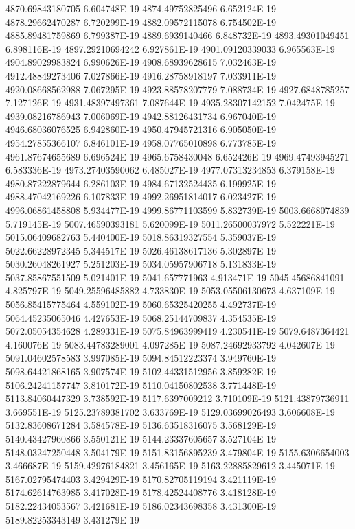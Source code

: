 4870.69843180705  6.604748E-19
4874.49752825496  6.652124E-19
4878.29662470287  6.720299E-19
4882.09572115078  6.754502E-19
4885.89481759869  6.799387E-19
4889.6939140466  6.848732E-19
4893.49301049451  6.898116E-19
4897.29210694242  6.927861E-19
4901.09120339033  6.965563E-19
4904.89029983824  6.990626E-19
4908.68939628615  7.032463E-19
4912.48849273406  7.027866E-19
4916.28758918197  7.033911E-19
4920.08668562988  7.067295E-19
4923.88578207779  7.088734E-19
4927.6848785257  7.127126E-19
4931.48397497361  7.087644E-19
4935.28307142152  7.042475E-19
4939.08216786943  7.006069E-19
4942.88126431734  6.967040E-19
4946.68036076525  6.942860E-19
4950.47945721316  6.905050E-19
4954.27855366107  6.846101E-19
4958.07765010898  6.773785E-19
4961.87674655689  6.696524E-19
4965.6758430048  6.652426E-19
4969.47493945271  6.583336E-19
4973.27403590062  6.485027E-19
4977.07313234853  6.379158E-19
4980.87222879644  6.286103E-19
4984.67132524435  6.199925E-19
4988.47042169226  6.107833E-19
4992.26951814017  6.023427E-19
4996.06861458808  5.934477E-19
4999.86771103599  5.832739E-19
5003.6668074839  5.719145E-19
5007.46590393181  5.620099E-19
5011.26500037972  5.522221E-19
5015.06409682763  5.440400E-19
5018.86319327554  5.359037E-19
5022.66228972345  5.344517E-19
5026.46138617136  5.302897E-19
5030.26048261927  5.251203E-19
5034.05957906718  5.131833E-19
5037.85867551509  5.021401E-19
5041.657771963  4.913471E-19
5045.45686841091  4.825797E-19
5049.25596485882  4.733830E-19
5053.05506130673  4.637109E-19
5056.85415775464  4.559102E-19
5060.65325420255  4.492737E-19
5064.45235065046  4.427653E-19
5068.25144709837  4.354535E-19
5072.05054354628  4.289331E-19
5075.84963999419  4.230541E-19
5079.6487364421  4.160076E-19
5083.44783289001  4.097285E-19
5087.24692933792  4.042607E-19
5091.04602578583  3.997085E-19
5094.84512223374  3.949760E-19
5098.64421868165  3.907574E-19
5102.44331512956  3.859282E-19
5106.24241157747  3.810172E-19
5110.04150802538  3.771448E-19
5113.84060447329  3.738592E-19
5117.6397009212  3.710109E-19
5121.43879736911  3.669551E-19
5125.23789381702  3.633769E-19
5129.03699026493  3.606608E-19
5132.83608671284  3.584578E-19
5136.63518316075  3.568129E-19
5140.43427960866  3.550121E-19
5144.23337605657  3.527104E-19
5148.03247250448  3.504179E-19
5151.83156895239  3.479804E-19
5155.6306654003  3.466687E-19
5159.42976184821  3.456165E-19
5163.22885829612  3.445071E-19
5167.02795474403  3.429429E-19
5170.82705119194  3.421119E-19
5174.62614763985  3.417028E-19
5178.42524408776  3.418128E-19
5182.22434053567  3.421681E-19
5186.02343698358  3.431300E-19
5189.82253343149  3.431279E-19
